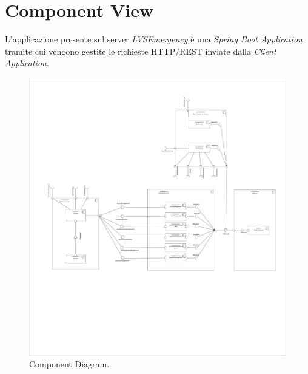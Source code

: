 \section{Component View}
L'applicazione presente sul server \textit{LVSEmergency} è una \textit{Spring Boot Application} tramite cui vengono gestite le richieste HTTP/REST inviate dalla \textit{Client Application}.

\begin{figure}[h!]
	\centering
	\includegraphics[width=1\linewidth]{./Iterazione 1/OtherFiles/UML - Component View}
	\caption{Component Diagram.}
	\label{fig:ComponentDiagram}
\end{figure}